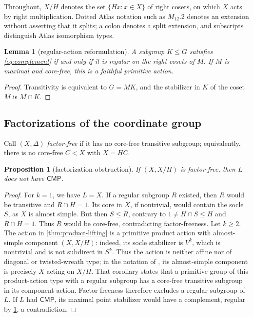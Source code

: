 \documentclass[11pt]{amsart}
\newcommand{\CMP}{\mathsf{CMP}}
\newtheorem{proposition}[theorem]{Proposition}
\newtheorem{lemma}[theorem]{Lemma}
\theoremstyle{definition}
\begin{document}
Throughout, \(X/H\) denotes the set \(\{Hx:x\in X\}\) of right cosets, on
which \(X\) acts by right multiplication.  Dotted Atlas notation such as
\(M_{12}.2\) denotes an extension without asserting that it splits; a colon
denotes a split extension, and subscripts distinguish Atlas isomorphism
types.

\begin{lemma}[regular-action reformulation]\label{lem:regular}
A subgroup \(K\leq G\) satisfies \eqref{eq:complement} if and only if it is
regular on the right cosets of \(M\).  If \(M\) is maximal and core-free,
this is a faithful primitive action.
\end{lemma}

\begin{proof}
Transitivity is equivalent to \(G=MK\), and the stabilizer in \(K\) of the
coset \(M\) is \(M\cap K\).
\end{proof}

\subsection{Factorizations of the coordinate group}

Call \((X,\Delta)\) \emph{factor-free} if it has no core-free transitive
subgroup; equivalently, there is no core-free \(C<X\) with \(X=HC\).

\begin{proposition}[factorization obstruction]\label{prop:coordinate}
If \((X,X/H)\) is factor-free, then \(L\) does not have \(\CMP\).
\end{proposition}

\begin{proof}
For \(k=1\), we have \(L=X\).  If a regular subgroup \(R\) existed, then
\(R\) would be transitive and \(R\cap H=1\).  Its core in \(X\), if
nontrivial, would contain the socle \(S\), as \(X\) is almost simple.  But
then \(S\leq R\), contrary to
\(1\ne H\cap S\leq H\) and \(R\cap H=1\).  Thus \(R\) would be core-free,
contradicting factor-freeness.  Let \(k\ge2\).  The action in
\cref{thm:product-lifting} is a
primitive product action with almost-simple component
\((X,X/H)\): indeed, its socle stabilizer is \(V^k\), which is nontrivial
and is not subdirect in \(S^k\).  Thus the action is neither affine nor of
diagonal or twisted-wreath type; in the notation of
\cite[Corollary 3(iv)]{lps-transitive}, its almost-simple component is
precisely \(X\) acting on \(X/H\).  That corollary states that a primitive
group of this product-action type with a regular subgroup has a core-free
transitive subgroup in its component action.  Factor-freeness therefore
excludes a regular subgroup of \(L\).  If \(L\) had \(\CMP\), its maximal
point stabilizer would have a complement, regular by \cref{lem:regular}, a
contradiction.
\end{proof}
\end{document}
